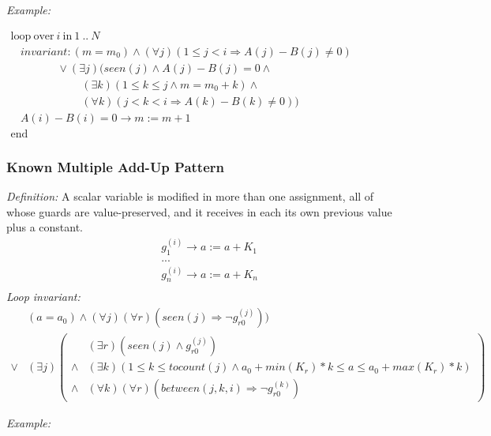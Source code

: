 \documentclass[a4paper,10pt]{article}
\newcommand{\idx}{\ensuremath{i}\xspace}
\newcommand{\at}[1]{{(#1)}}
\newcommand{\KWloop}{\ensuremath{\mathrm{loop}~}}
\newcommand{\KWend}{\ensuremath{\mathrm{end}~}}
\newcommand{\KWover}{\ensuremath{\mathrm{over}~}}
\newcommand{\KWin}{\ensuremath{~\mathrm{in}~}}
\newcommand{\impl}{\ensuremath{\Longrightarrow}}
\newcommand{\seen}[1]{\ensuremath{\mathit{seen}(#1)}\xspace}
\newcommand{\tocount}[1]{\ensuremath{\mathit{tocount}(#1)}\xspace}
\newcommand{\between}[3]{\ensuremath{\mathit{between}{(#1,#2,#3)}}\xspace}
\newcommand{\loopinvariant}{\noindent\textit{Loop invariant:}\xspace}
\newcommand{\patterndef}{\noindent\textit{Definition:}\xspace}
\newcommand{\patternexample}{\noindent\textit{Example:}\xspace}
\begin{document}
\bigskip
\patternexample

\medskip
$\begin{array}{l}
  \KWloop \KWover i \KWin 1~..~N \\
  ~~~~ \textit{invariant}: (m = m_0) \land (\forall j)(1\leq j < i \impl A(j)-B(j)\neq0)\\
  ~~~~~~~~~~~~~~~~~~~ \lor (\exists j)(\seen{j} \land A(j)-B(j)= 0 \land \\
  ~~~~~~~~~~~~~~~~~~~~~~~~~~~~~ (\exists k)(1 \leq k \leq j \land m = m_0 + k) \land\\
  ~~~~~~~~~~~~~~~~~~~~~~~~~~~~~ (\forall k)(j < k < i \impl A(k)-B(k)\neq0))\\
  ~~~~ A(i)-B(i)=0 \rightarrow m := m+1\\
  \KWend
\end{array}$

\subsubsection*{Known Multiple Add-Up Pattern}

\patterndef A scalar variable is modified in more than one assignment, all of
whose guards are value-preserved, and it receives in each its own previous value
plus a constant.
%
\begin{eqnarray*}
&g_1^\at{\idx} \rightarrow a := a + K_1\\
&...\\
&g_n^\at{\idx} \rightarrow a := a + K_n\\
\end{eqnarray*}
%
\loopinvariant
%
\begin{eqnarray*}
&(a = a_0) \land (\forall j)(\forall r)( \seen{j} \impl \neg g_{r0}^\at{j})) \\
\lor 
& (\exists j)
\left(\begin{array}{cl}
&(\exists r)(\seen{j} \land g_{r0}^\at{j}) \\
\land& (\exists k)(1 \leq k \leq \tocount{j} \land a_0 + \mathit{min}(K_r) * k \leq a \leq a_0 + \mathit{max}(K_r) * k) \\
\land& (\forall k)(\forall r)(\between{j}{k}{\idx} \impl \neg g_{r0}^\at{k})
\end{array}\right)
\end{eqnarray*}

\bigskip
\patternexample
\end{document}
